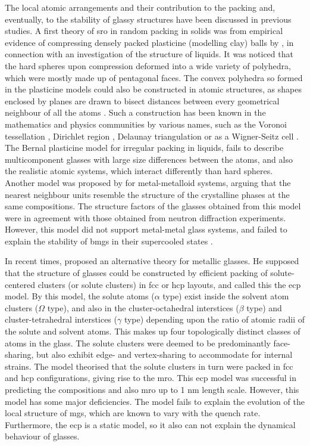 The local atomic arrangements and their contribution to the packing and, eventually, to the stability of glassy structures have been discussed in previous studies. A first theory of \gls{sro} in random packing in solids was from empirical evidence of compressing densely packed plasticine (modelling clay) balls by \textcite{Bernal1959}, in connection with an investigation of the structure of liquids. It was noticed that the hard spheres upon compression deformed into a wide variety of polyhedra, which were mostly made up of pentagonal faces. The convex polyhedra so formed in the plasticine models could also be constructed in atomic structures, as shapes enclosed by planes are drawn to bisect distances between every geometrical neighbour of all the atoms \cite{Bernal1959,Finney1970a}. Such a construction has been known in the mathematics and physics communities by various names, such as the Voronoi tessellation \cite{Voronoi1908,Coxeter1973}, Dirichlet region \cite{Dirichlet1850}, Delaunay triangulation \cite{Delaunay1934} or as a Wigner-Seitz cell \cite{Kittel2004}. The Bernal plasticine model for irregular packing in liquids, fails to describe multicomponent glasses with large size differences between the atoms, and also the realistic atomic systems, which interact differently than hard spheres. Another model was proposed by \textcite{Gaskell1978} for metal-metalloid systems, arguing that the nearest neighbour units resemble the structure of the crystalline phases at the same compositions. The structure factors of the glasses obtained from this model were in agreement with those obtained from neutron diffraction experiments. However, this model did not support metal-metal glass systems, and failed to explain the stability of \gls{bmg}s in their supercooled states \cite{Chen2011a}. \par

In recent times, \textcite{Miracle2004} proposed an alternative theory for metallic glasses. He supposed that the structure of glasses could be constructed by efficient packing of solute-centered clusters (or solute clusters) in \gls{fcc} or \gls{hcp} layouts, and called this the \gls{ecp} 
model. By this model, the solute atoms ($\alpha$ type) exist inside the solvent atom clusters ($\Omega$ type), and also in the cluster-octahedral interstices ($\beta$ type) and cluster-tetrahedral interstices ($\gamma$ type) depending upon the ratio of atomic radii of the solute and solvent atoms. This makes up four topologically distinct classes of atoms in the glass. The solute clusters were deemed to be predominantly face-sharing, but also exhibit edge- and 
vertex-sharing to accommodate for internal strains. The model theorised that the solute clusters in turn were packed in \gls{fcc} and \gls{hcp} configurations, giving rise to the \gls{mro}. This \gls{ecp} model was successful in predicting the compositions and also \gls{mro} up to 1 nm length 
scale. However, this model has some major deficiencies. The model fails to explain the evolution of the local structure of \gls{mg}s, which are known to vary with the quench rate. Furthermore, the \gls{ecp} is a static model, so it also can not explain the dynamical behaviour of glasses. \par

